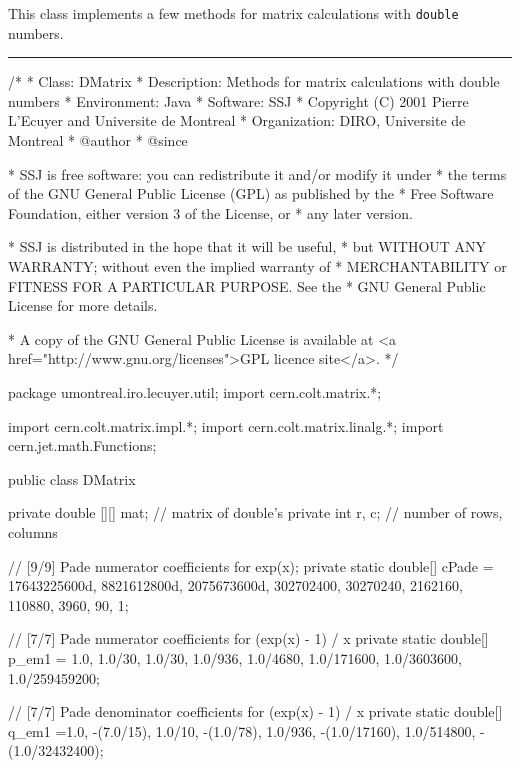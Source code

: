 
This class implements a few methods for matrix calculations
with \texttt{double} numbers.

\bigskip\hrule

\begin{code}\begin{hide}
/*
 * Class:        DMatrix
 * Description:  Methods for matrix calculations with double numbers
 * Environment:  Java
 * Software:     SSJ
 * Copyright (C) 2001  Pierre L'Ecuyer and Universite de Montreal
 * Organization: DIRO, Universite de Montreal
 * @author
 * @since

 * SSJ is free software: you can redistribute it and/or modify it under
 * the terms of the GNU General Public License (GPL) as published by the
 * Free Software Foundation, either version 3 of the License, or
 * any later version.

 * SSJ is distributed in the hope that it will be useful,
 * but WITHOUT ANY WARRANTY; without even the implied warranty of
 * MERCHANTABILITY or FITNESS FOR A PARTICULAR PURPOSE.  See the
 * GNU General Public License for more details.

 * A copy of the GNU General Public License is available at
   <a href="http://www.gnu.org/licenses">GPL licence site</a>.
 */
\end{hide}
package umontreal.iro.lecuyer.util;
   import cern.colt.matrix.*;\begin{hide}
   import cern.colt.matrix.impl.*;
   import cern.colt.matrix.linalg.*;
   import cern.jet.math.Functions;\end{hide}


public class DMatrix \begin{hide} {
   private double [][] mat;        // matrix of double's
   private int r, c;               // number of rows, columns

   // [9/9] Pade numerator coefficients for exp(x);
   private static double[] cPade = {17643225600d, 8821612800d, 2075673600d,
       302702400, 30270240,  2162160, 110880, 3960, 90, 1};

   // [7/7] Pade numerator coefficients for (exp(x) - 1) / x
   private static double[] p_em1 = {1.0, 1.0/30, 1.0/30, 1.0/936,
       1.0/4680, 1.0/171600, 1.0/3603600, 1.0/259459200};

   // [7/7] Pade denominator coefficients for (exp(x) - 1) / x
   private static double[] q_em1 ={1.0, -(7.0/15), 1.0/10, -(1.0/78),
       1.0/936, -(1.0/17160), 1.0/514800, -(1.0/32432400)};


}
\end{hide}
\end{code}
